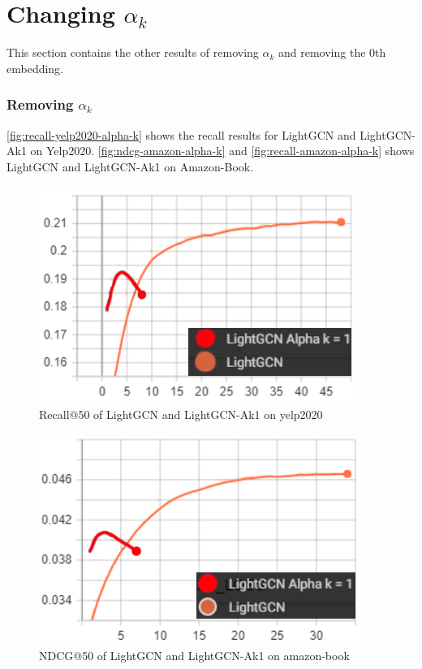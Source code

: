 \section{Changing $\alpha_k$}
This section contains the other results of removing $\alpha_k$ and removing the 0th embedding.

\subsubsection{Removing $\alpha_k$}\label{app:removing-alpha-k}
\autoref{fig:recall-yelp2020-alpha-k} shows the recall results for LightGCN and LightGCN-Ak1 on Yelp2020.
\autoref{fig:ndcg-amazon-alpha-k} and \autoref{fig:recall-amazon-alpha-k} shows LightGCN and LightGCN-Ak1 on Amazon-Book.
\begin{figure}[h!]
    \includegraphics[width=\linewidth]{figures/alpha-k-results/yelp2020-recall.png}
    \caption{Recall@50 of LightGCN and LightGCN-Ak1 on yelp2020}
    \label{fig:recall-yelp2020-alpha-k}
\end{figure}
\begin{figure}[h!]
    \includegraphics[width=\linewidth]{figures/alpha-k-results/amazon-ndcg.png}
    \caption{NDCG@50 of LightGCN and LightGCN-Ak1 on amazon-book}
    \label{fig:ndcg-amazon-alpha-k}
\end{figure}
